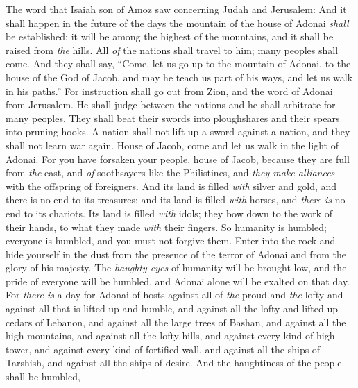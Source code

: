 \begin{biblechapter} %
 The word that Isaiah son of Amoz saw concerning Judah and Jerusalem:
\verse And it shall happen in the future of the days 
the mountain of the house of Adonai \textit{shall} be established; 
it will be among the highest of the mountains, 
and it shall be raised from \textit{the} hills. 
All \textit{of} the nations shall travel to him;
\verse many peoples shall come. 
And they shall say, 
“Come, let us go up to the mountain of Adonai, 
to the house of the God of Jacob, 
and may he teach us part of his ways, 
and let us walk in his paths.” 
For instruction shall go out from Zion, 
and the word of Adonai from Jerusalem.
\verse He shall judge between the nations 
and he shall arbitrate for many peoples. 
They shall beat their swords into ploughshares 
and their spears into pruning hooks. 
A nation shall not lift up a sword against a nation, 
and they shall not learn war again.
 House of Jacob, come and let us walk in the light of Adonai.
\verse For you have forsaken your people, house of Jacob, 
because they are full from \textit{the} east, 
and \textit{of} soothsayers like the Philistines, 
and \textit{they make alliances} with the offspring of foreigners.
\verse And its land is filled \textit{with} silver and gold, 
and there is no end to its treasures; 
and its land is filled \textit{with} horses, 
and \textit{there is} no end to its chariots.
\verse Its land is filled \textit{with} idols; 
they bow down to the work of their hands, 
to what they made \textit{with} their fingers.
\verse So humanity is humbled; 
everyone is humbled, 
and you must not forgive them.
\verse Enter into the rock 
and hide yourself in the dust 
from the presence of the terror of Adonai 
and from the glory of his majesty.
\verse The \textit{haughty eyes} of humanity will be brought low, 
and the pride of everyone will be humbled, 
and Adonai alone will be exalted on that day.
\verse For \textit{there is} a day for Adonai of hosts 
against all of \textit{the} proud and \textit{the} lofty 
and against all that is lifted up and humble,
\verse and against all the lofty and lifted up cedars of Lebanon, 
and against all the large trees of Bashan,
\verse and against all the high mountains, 
and against all the lofty hills,
\verse and against every kind of high tower, 
and against every kind of fortified wall,
\verse and against all the ships of Tarshish, 
and against all the ships of desire.
\verse And the haughtiness of the people shall be humbled, 

\end{biblechapter}
